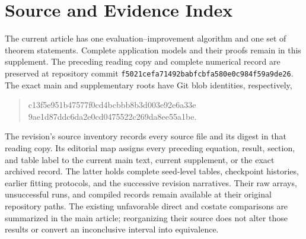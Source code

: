 \section{Source and Evidence Index}\label{app:r15index}
The current article has one evaluation--improvement algorithm and one set of
theorem statements. Complete application models and their proofs remain in this
supplement. The preceding reading copy and complete numerical record are
preserved at repository commit
\texttt{f5021cef\allowbreak a71492ba\allowbreak bfcbfa58\allowbreak 0e0c984f\allowbreak 59a9de26}.
The exact main and supplementary roots have Git blob identities, respectively,
\begin{quote}\small\ttfamily
c13f5e95\allowbreak 1b47577f\allowbreak 0cd4bcbb\allowbreak b8b3d003\allowbreak e92e6a33e\\
9ae1d87d\allowbreak dc6da2e0\allowbreak cd047552\allowbreak 2c269da8\allowbreak ee55a1be.
\end{quote}

The revision's source inventory records every source file and its digest in
that reading copy. Its editorial map assigns every preceding equation,
result, section, and table label to the current main text, current supplement,
or the exact archived record. The latter holds complete seed-level tables,
checkpoint histories, earlier fitting protocols, and the successive revision
narratives. Their raw arrays, unsuccessful runs, and compiled records remain
available at their original repository paths. The existing unfavorable direct
and costate comparisons are summarized in the main article; reorganizing their
source does not alter those results or convert an inconclusive interval into
equivalence.
